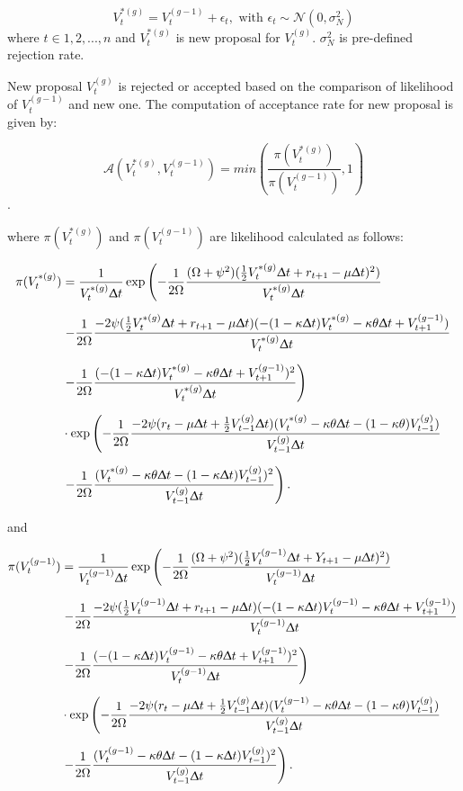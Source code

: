 \documentclass[12pt,a4paper]{article}
\numberwithin{equation}{section}
\begin{document}
\[V_t^{*(g)} = V_t^{(g-1)} + \epsilon_t, \text{ with } \epsilon_t \sim \mathcal{N}(0, \sigma_N^2)\]
where $t \in {1, 2, ..., n}$ and $V_t^{*(g)}$ is new proposal for $V_t^{(g)}$. $\sigma_N^2$ is pre-defined rejection rate. 

New proposal $V_t^{(g)}$ is rejected or accepted based on the comparison of likelihood of $V_t^{(g-1)}$ and new one. The computation of acceptance rate for new proposal is given by:

\[\mathcal{A}(V_t^{*(g)}, V_t^{(g-1)}) = min \left( \frac{\pi(V_t^{*(g)})}{\pi(V_t^{(g-1)})}, 1 \right)\]. 

where $\pi(V_t^{*(g)})$ and $\pi(V_t^{(g-1)})$ are likelihood calculated as follows:

\begin{align*}
\pi(V_t^{*(g)}) &= \frac{1}{V_t^{*(g)} \Updelta t} \exp \left( -\frac{1}{2 \Omega} \frac{(\Omega + \psi^2)(\frac{1}{2} V_t^{*(g)} \Updelta t + r_{t+1} - \mu \Updelta t)^2)}{V_t^{*(g)} \Updelta t} \right.\\[0.6em]
& \left. -\frac{1}{2\Omega}\frac{-2\psi (\frac{1}{2}V_t^{*(g)} \Updelta t + r_{t+1} - \mu \Updelta t)(-(1-\kappa\Updelta t) V_t^{*(g)} -\kappa \theta \Updelta t + V_{t+1}^{(g-1)})}{V_t^{*(g)} \Updelta t} \right.\\[0.6em]
& \left. -\frac{1}{2\Omega}\frac{(-(1-\kappa \Updelta t) V_t^{*(g)} -\kappa \theta \Updelta t + V_{t+1}^{(g-1)})^2}{V_t^{*(g)} \Updelta t} \right)\\[0.6em]
& \cdot \exp \left( - \frac{1}{2 \Omega} \frac{-2 \psi (r_t - \mu \Updelta t + \frac{1}{2}V_{t-1}^{(g)} \Updelta t)(V_t^{*(g)} - \kappa \theta \Updelta t - (1-\kappa \theta)V_{t-1}^{(g)})}{V_{t-1}^{(g)} \Updelta t} \right. \\[0.6em]
& \left. -\frac{1}{2 \Omega} \frac{(V_t^{*(g)} - \kappa \theta \Updelta t - (1-\kappa\Updelta t)V_{t-1}^{(g)})^2}{V_{t-1}^{(g)}\Updelta t}\right).
\end{align*}

and 

\begin{align*}
\pi(V_t^{(g-1)}) &= \frac{1}{V_t^{(g-1)} \Updelta t} \exp \left( -\frac{1}{2 \Omega} \frac{(\Omega + \psi^2)(\frac{1}{2} V_t^{(g-1)} \Updelta t + Y_{t+1} - \mu \Updelta t)^2)}{V_t^{(g-1)} \Updelta t} \right.\\[0.6em]
& \left. -\frac{1}{2\Omega}\frac{-2\psi (\frac{1}{2}V_t^{(g-1)} \Updelta t + r_{t+1} - \mu \Updelta t)(-(1-\kappa\Updelta t) V_t^{(g-1)} -\kappa \theta \Updelta t + V_{t+1}^{(g-1)})}{V_t^{(g-1)} \Updelta t} \right.\\[0.6em]
& \left. -\frac{1}{2\Omega}\frac{(-(1-\kappa \Updelta t) V_t^{(g-1)} -\kappa \theta \Updelta t + V_{t+1}^{(g-1)})^2}{V_t^{(g-1)} \Updelta t} \right)\\[0.6em]
& \cdot \exp \left( - \frac{1}{2 \Omega} \frac{-2 \psi (r_t - \mu \Updelta t + \frac{1}{2}V_{t-1}^{(g)} \Updelta t)(V_t^{(g-1)} - \kappa \theta \Updelta t - (1-\kappa \theta)V_{t-1}^{(g)})}{V_{t-1}^{(g)} \Updelta t} \right. \\[0.6em]
& \left. -\frac{1}{2 \Omega} \frac{(V_t^{(g-1)} - \kappa \theta \Updelta t - (1-\kappa\Updelta t)V_{t-1}^{(g)})^2}{V_{t-1}^{(g)}\Updelta t}\right).
\end{align*}
\end{document}
